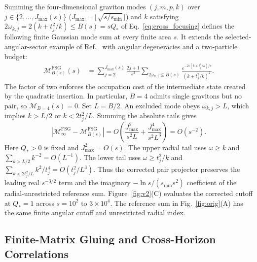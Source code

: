 \documentclass[onecolumn,11pt,aps,prd,amsmath,amssymb,nofootinbib,floatfix]{revtex4-2}
\newcommand{\calM}{\mathcal{M}}
\begin{document}
Summing the four-dimensional graviton modes $(j,m,p,k)$ over $j\in\{2,\dots,J_{\max}(s)\}$ ($J_{\max}=\lfloor\sqrt{s/s_{\min}}\rfloor$) and $k$ satisfying $2\omega_{k,j}=2(k+t_j^2/k)\le B(s)=sQ_*$ of Eq.~\eqref{eq:cross_focusing} defines the following finite Gaussian mode sum at every finite area $s$. It extends the selected-angular-sector example of Ref.~\cite{Chandrasekaran2026} with angular degeneracies and a two-particle budget:
\begin{align}\label{eq:sec44_4d}
\calM_{B(s)}^{\mathrm{FSG}}(s)
&= \sum_{j=2}^{J_{\max}(s)}\frac{2j+1}{s^2}\sum_{2\omega_{k,j}\le B(s)}\frac{e^{-2i(k+t_j^2/k)/s}}{(k+t_j^2/k)^2}.
\end{align}
The factor of two enforces the occupation cost of the intermediate state created by the quadratic insertion. In particular, $B=4$ admits single gravitons but no pair, so $\calM_{B=4}(s)=0$. Set $L=B/2$. An excluded mode obeys $\omega_{k,j}>L$, which implies $k>L/2$ or $k<2t_j^2/L$. Summing the absolute tails gives
\begin{equation}\label{eq:tail_bound}
|\calM_\infty^{\mathrm{FSG}}-\calM_{B(s)}^{\mathrm{FSG}}| = O\!\left(\frac{J_{\max}^2}{s^2 L}+\frac{J_{\max}^4}{s^2 L^3}\right) = O(s^{-2}).
\end{equation}
Here $Q_*>0$ is fixed and $J_{\max}^2=O(s)$. The upper radial tail uses $\omega\ge k$ and $\sum_{k>L/2} k^{-2}=O(L^{-1})$. The lower tail uses $\omega\ge t_j^2/k$ and $\sum_{k<2t_j^2/L} k^2/t_j^4=O(t_j^2/L^3)$. Thus the corrected pair projector preserves the leading real $s^{-3/2}$ term and the imaginary $-\ln s/(s_{\min}s^2)$ coefficient of the radial-unrestricted reference sum. Figure~\ref{fig:v2}(C) evaluates the corrected cutoff at $Q_*=1$ across $s=10^2$ to $3\times10^4$. The reference sum in Fig.~\ref{fig:orig}(A) has the same finite angular cutoff and unrestricted radial index.

\subsection{Finite-Matrix Gluing and Cross-Horizon Correlations}\label{sec:orig_54}
\end{document}
